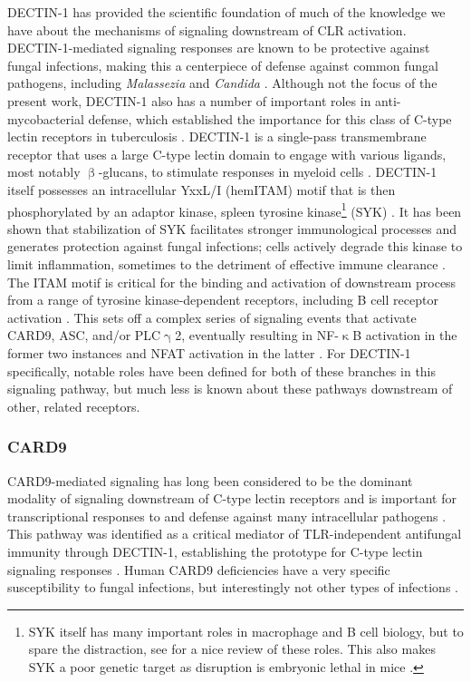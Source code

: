 DECTIN\hyp{}1 has provided the scientific foundation of much of the knowledge we have about the mechanisms of signaling downstream of CLR activation. DECTIN\hyp{}1\hyp{}mediated signaling responses are known to be protective against fungal infections, making this a centerpiece of defense against common fungal pathogens, including \textit{Malassezia} and \textit{Candida} \citep{Shiokawa2017}. Although not the focus of the present work, DECTIN\hyp{}1 also has a number of important roles in anti\hyp{}mycobacterial defense, which established the importance for this class of C\hyp{}type lectin receptors in tuberculosis \citep{Yadav2006}. DECTIN\hyp{}1 is a single\hyp{}pass transmembrane receptor that uses a large C\hyp{}type lectin domain to engage with various ligands, most notably $\upbeta$\hyp{}glucans, to stimulate responses in myeloid cells \citep{Brown2007}. DECTIN\hyp{}1 itself possesses an intracellular YxxL/I (hemITAM) motif that is then phosphorylated by an adaptor kinase, spleen tyrosine kinase\footnote{SYK itself has many important roles in macrophage and B cell biology, but to spare the distraction, see \citet{Mocsai2010} for a nice review of these roles. This also makes SYK a poor genetic target as disruption is embryonic lethal in mice \citep{Yanagi2001}.} (SYK) \citep{Getahun2015, Kerrigan2011, Bauer2017}. It has been shown that stabilization of SYK facilitates stronger immunological processes and generates protection against fungal infections; cells actively degrade this kinase to limit inflammation, sometimes to the detriment of effective immune clearance \citep{Wirnsberger2016, Zhu2016, Sohn2003}. The ITAM motif is critical for the binding and activation of downstream process from a range of tyrosine kinase\hyp{}dependent receptors, including B cell receptor activation \citep{Monroe2006, Bauer2017}. This sets off a complex series of signaling events that activate CARD9, ASC, and/or PLC$\upgamma$2, eventually resulting in NF\hyp{}$\upkappa$B activation in the former two instances and NFAT activation in the latter \citep{Geijtenbeek2009, Drummond2013}. For DECTIN\hyp{}1 specifically, notable roles have been defined for both of these branches in this signaling pathway, but much less is known about these pathways downstream of other, related receptors.

\subsubsection{CARD9}\label{clr:card9}

CARD9\hyp{}mediated signaling has long been considered to be the dominant modality of signaling downstream of C\hyp{}type lectin receptors and is important for transcriptional responses to and defense against many intracellular pathogens \citep{Hsu2007, Hara2007}. This pathway was identified as a critical mediator of TLR\hyp{}independent antifungal immunity through DECTIN\hyp{}1, establishing the prototype for C\hyp{}type lectin signaling responses \citep{Gross2006}. Human CARD9 deficiencies have a very specific susceptibility to fungal infections, but interestingly not other types of infections \citep{Drummond2018, Drummond2016}.

